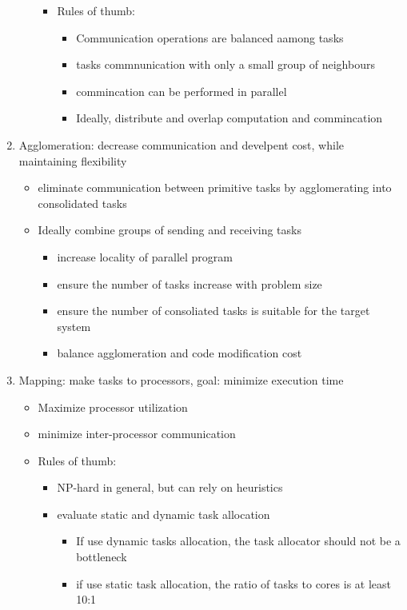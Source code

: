 \documentclass{article}
\begin{document}
\begin{enumerate}
\begin{itemize}
\begin{itemize}
\begin{itemize}
            \end{itemize}
            \item Rules of thumb:
            \begin{itemize}
                \item Communication operations are balanced aamong tasks
                \item tasks commnunication with only a small group of neighbours
                \item commincation can be performed in parallel
                \item Ideally, distribute and overlap computation and commincation 
            \end{itemize}
        \end{itemize}
    \end{itemize}
    \item Agglomeration: decrease communication and develpent cost, while maintaining flexibility
    \begin{itemize}
        \item eliminate communication between primitive tasks by agglomerating into consolidated tasks
        \item Ideally combine groups of sending and receiving tasks 
        \begin{itemize}
            \item increase locality of parallel program
            \item ensure the number of tasks increase with problem size 
            \item ensure the number of consoliated tasks is suitable for the target system
            \item balance agglomeration and code modification cost
        \end{itemize}
    \end{itemize}
    \item Mapping: make tasks to processors, goal: minimize execution time
    \begin{itemize}
        \item Maximize processor utilization
        \item minimize inter-processor communication
        \item Rules of thumb:
        \begin{itemize}
            \item NP-hard in general, but can rely on heuristics
            \item evaluate static and dynamic task allocation
            \begin{itemize}
                \item If use dynamic tasks allocation, the task allocator should not be a bottleneck
                \item if use static task allocation, the ratio of tasks to cores is at least 10:1
            \end{itemize}
        \end{itemize}
    \end{itemize}
\end{enumerate}
\end{document}
